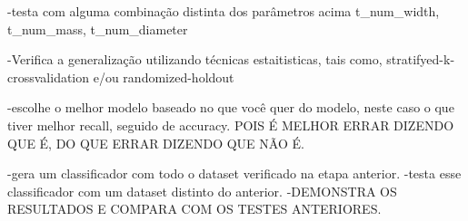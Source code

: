 -testa com alguma combinação distinta dos parâmetros acima
t_num_width, t_num_mass, t_num_diameter 

-Verifica a generalização utilizando técnicas estaitisticas, tais como, stratifyed-k-crossvalidation e/ou randomized-holdout

-escolhe o melhor modelo baseado no que você quer do modelo, neste caso o que tiver melhor recall, seguido de accuracy. POIS É MELHOR ERRAR DIZENDO QUE É, DO QUE ERRAR DIZENDO QUE NÃO É.

-gera um classificador com todo o dataset verificado na etapa anterior.
-testa esse classificador com um dataset distinto do anterior.
-DEMONSTRA OS RESULTADOS E COMPARA COM OS TESTES ANTERIORES.